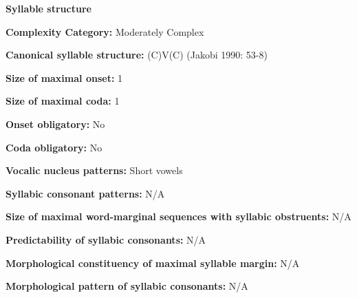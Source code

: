 \begin{styleBody}
\textbf{Syllable structure}
\end{styleBody}

\begin{styleBody}
\textbf{Complexity Category:} Moderately Complex
\end{styleBody}

\begin{styleBody}
\textbf{Canonical syllable structure:} (C)V(C) (Jakobi 1990: 53-8)
\end{styleBody}

\begin{styleBody}
\textbf{Size of maximal onset:} 1
\end{styleBody}

\begin{styleBody}
\textbf{Size of maximal coda:} 1
\end{styleBody}

\begin{styleBody}
\textbf{Onset obligatory: }No
\end{styleBody}

\begin{styleBody}
\textbf{Coda obligatory:} No
\end{styleBody}

\begin{styleBody}
\textbf{Vocalic nucleus patterns:} Short vowels
\end{styleBody}

\begin{styleBody}
\textbf{Syllabic consonant patterns:} N/A
\end{styleBody}

\begin{styleBody}
\textbf{Size of maximal word{}-marginal sequences with syllabic obstruents:} N/A
\end{styleBody}

\begin{styleBody}
\textbf{Predictability of syllabic consonants:} N/A
\end{styleBody}

\begin{styleBody}
\textbf{Morphological constituency of maximal syllable margin:} N/A
\end{styleBody}

\begin{styleBody}
\textbf{Morphological pattern of syllabic consonants:} N/A
\end{styleBody}


